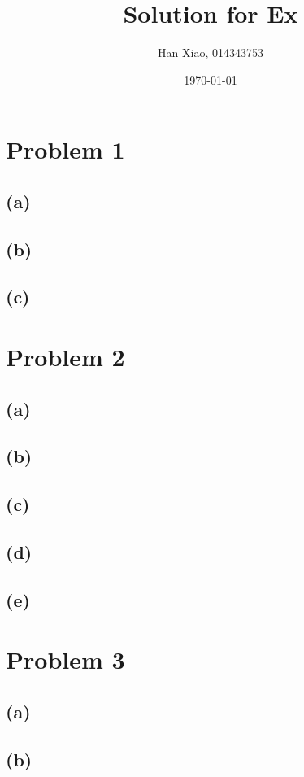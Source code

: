\documentclass{article}
\title{Solution for Ex}
\author{Han Xiao, 014343753}
\date{\today}
\begin{document}
\maketitle

\section{Problem 1}
\subsection{(a)}
\subsection{(b)}
\subsection{(c)}

\section{Problem 2}
\subsection{(a)}
\subsection{(b)}
\subsection{(c)}
\subsection{(d)}
\subsection{(e)}

\section{Problem 3}
\subsection{(a)}
\subsection{(b)}
\end{document}

